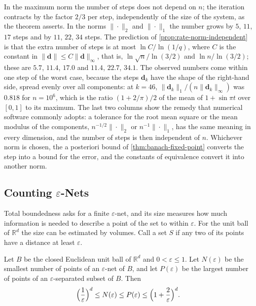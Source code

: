 In the maximum norm the number of steps does not depend on $n$; the iteration contracts by the factor $2/3$ per step, independently of the size of the system, as the theorem asserts. In the norms $\|\cdot\|_2$ and $\|\cdot\|_1$ the number grows by $5$, $11$, $17$ steps and by $11$, $22$, $34$ steps. The prediction of \cref{prop:rate-norm-independent} is that the extra number of steps is at most $\ln C/\ln(1/q)$, where $C$ is the constant in $\|\mathbf d\|\le C\|\mathbf d\|_\infty$, that is, $\ln\sqrt n/\ln(3/2)$ and $\ln n/\ln(3/2)$; these are $5.7$, $11.4$, $17.0$ and $11.4$, $22.7$, $34.1$. The observed numbers come within one step of the worst case, because the steps $\mathbf d_k$ have the shape of the right-hand side, spread evenly over all components: at $k=46$, $\|\mathbf d_k\|_1/(n\|\mathbf d_k\|_\infty)$ was $0.818$ for $n=10^6$, which is the ratio $(1+2/\pi)/2$ of the mean of $1+\sin\pi t$ over $[0,1]$ to its maximum. The last two columns show the remedy that numerical software commonly adopts: a tolerance for the root mean square or the mean modulus of the components, $n^{-1/2}\|\cdot\|_2$ or $n^{-1}\|\cdot\|_1$, has the same meaning in every dimension, and the number of steps is then independent of $n$. Whichever norm is chosen, the a posteriori bound of \cref{thm:banach-fixed-point} converts the step into a bound for the error, and the constants of equivalence convert it into another norm.

\subsection{Counting \texorpdfstring{$\varepsilon$}{epsilon}-Nets}

Total boundedness asks for a finite $\varepsilon$-net, and its size measures how much information is needed to describe a point of the set to within $\varepsilon$. For the unit ball of $\mathbb R^d$ the size can be estimated by volumes. Call a set $S$  if any two of its points have a distance at least $\varepsilon$.

\begin{proposition}
\label{prop:covering-numbers}
Let $B$ be the closed Euclidean unit ball of $\mathbb R^d$ and $0<\varepsilon\le1$. Let $N(\varepsilon)$ be the smallest number of points of an $\varepsilon$-net of $B$, and let $P(\varepsilon)$ be the largest number of points of an $\varepsilon$-separated subset of $B$. Then
\[
\Bigl(\frac1\varepsilon\Bigr)^d\le N(\varepsilon)\le P(\varepsilon)\le\Bigl(1+\frac2\varepsilon\Bigr)^d .
\]
\end{proposition}

